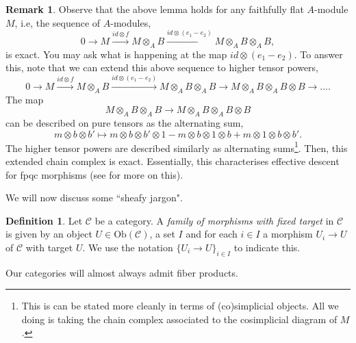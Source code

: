 \documentclass[11pt]{amsart}
\newcommand{\Ob}{\text{Ob}}
\theoremstyle{definition}
\newtheorem{definition}[theorem]{Definition}
\newtheorem{remark}[theorem]{Remark}
\begin{document}
\begin{remark}
Observe that the above lemma holds for any faithfully flat $A$-module $M$, i.e, the sequence of $A$-modules,
\[0\longrightarrow M\overset{id\otimes f}{\longrightarrow} M\otimes_A B \overset{id\otimes (e_1-e_2)}{\longrightarrow} M\otimes_A B\otimes_A B,\]
is exact. You may ask what is happening at the map $id\otimes (e_1-e_2)$. To answer this, note that we can extend this above sequence to higher tensor powers,
\[0\longrightarrow M\overset{id\otimes f}{\longrightarrow} M\otimes_A B \overset{id\otimes (e_1-e_2)}{\longrightarrow} M\otimes_A B\otimes_A B\rightarrow M\otimes_A B\otimes_A B\otimes B\rightarrow\ldots.\]
The map 
\[M\otimes_A B\otimes_A B\rightarrow M\otimes_A B\otimes_A B\otimes B\]
can be described on pure tensors as the alternating sum,
\[m\otimes b\otimes b'\mapsto m\otimes b\otimes b'\otimes 1- m\otimes b\otimes 1\otimes b + m\otimes 1\otimes b\otimes b'.\]
The higher tensor powers are described similarly as alternating sums\footnote{This is can be stated more cleanly in terms of (co)simplicial objects. All we doing is taking the chain complex associated to the cosimplicial diagram of $M$.}. Then, this extended chain complex is exact. Essentially, this characterises effective descent for fpqc morphisms (see \cite[Tag 023F]{stacks-project} for more on this).
\end{remark}

We will now discuss some ``sheafy jargon".

\begin{definition}
	\label{definition-family-morphisms-fixed-target}
	Let $\mathcal{C}$ be a category. A {\it family of morphisms with fixed target} in $\mathcal{C}$ is	given by an object $U \in \Ob(\mathcal{C})$, a set $I$ and
	for each $i\in I$ a morphism $U_i \to U$ of $\mathcal{C}$ with target $U$.
	We use the notation $\{U_i \to U\}_{i\in I}$ to indicate this.
\end{definition}

Our categories will almost always admit fiber products.
\end{document}
